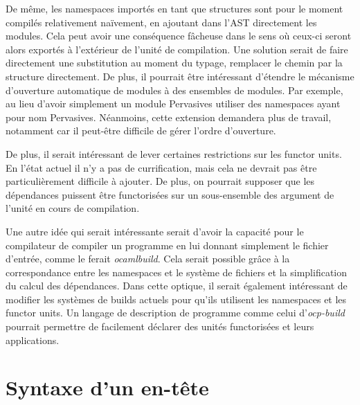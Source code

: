 \documentclass[11pt,a4paper]{report}
\begin{document}
De même, les namespaces importés en tant que structures sont pour le moment
compilés relativement naïvement, en ajoutant dans l'AST directement les
modules. Cela peut avoir une conséquence fâcheuse dans le sens où ceux-ci seront
alors exportés à l'extérieur de l'unité de compilation. Une solution serait de
faire directement une substitution au moment du typage, remplacer le chemin par
la structure directement. De plus, il pourrait être intéressant d'étendre le
mécanisme d'ouverture automatique de modules à des ensembles de modules. Par
exemple, au lieu d'avoir simplement un module Pervasives utiliser des namespaces
ayant pour nom Pervasives. Néanmoins, cette extension demandera plus de travail,
notamment car il peut-être difficile de gérer l'ordre d'ouverture.

De plus, il serait intéressant de lever certaines restrictions sur les functor
units. En l'état actuel il n'y a pas de currification, mais cela ne devrait pas
être particulièrement difficile à ajouter. De plus, on pourrait supposer que les
dépendances puissent être functorisées sur un sous-ensemble des argument de
l'unité en cours de compilation.

Une autre idée qui serait intéressante serait d'avoir la capacité pour le
compilateur de compiler un programme en lui donnant simplement le fichier
d'entrée, comme le ferait \emph{ocamlbuild}. Cela serait possible grâce à la
correspondance entre les namespaces et le système de fichiers et la
simplification du calcul des dépendances. Dans cette optique, il serait
également intéressant de modifier les systèmes de builds actuels pour qu'ils
utilisent les namespaces et les functor units. Un langage de description de
programme comme celui d'\emph{ocp-build} pourrait permettre de facilement
déclarer des unités functorisées et leurs applications.




\appendix

\chapter{Syntaxe d'un en-tête}
\label{header-bnf}
\end{document}
